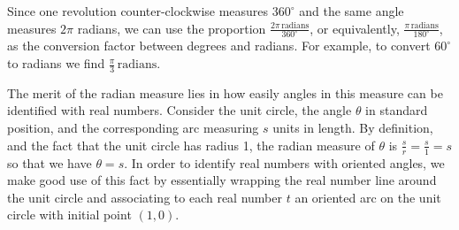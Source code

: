 Since one revolution counter-clockwise measures $360^{\circ}$ and the same angle measures $2 \pi$ radians, we can use the proportion $\frac{2 \pi \, \text{radians}}{360^{\circ}}$, or equivalently, $\frac{\pi \, \text{radians}}{180^{\circ}}$, as the conversion factor between degrees and radians.  For example, to convert $60^{\circ}$ to radians we find $ \frac{\pi}{3} \, \text{radians}$.  

The merit of the radian measure lies in how easily angles in this measure can be identified with real numbers.   Consider the unit circle,  the angle $\theta$ in standard position, and the corresponding arc measuring $s$ units in length.  By definition, and the fact that the unit circle has radius 1, the radian measure of $\theta$ is $\frac{s}{r}=\frac{s}{1} = s$ so that we have $\theta = s$.  In order to identify real numbers with oriented angles, we make good use of this fact by essentially  wrapping  the real number line around the unit circle and associating to each real number $t$ an oriented arc on the unit circle with initial point $(1,0)$.

